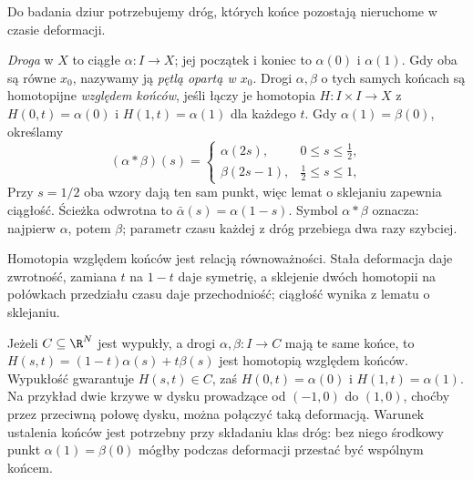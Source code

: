 Do badania dziur potrzebujemy dróg,
których końce pozostają nieruchome w czasie deformacji.

\begin{definicja}
\label{def:droga-petla}
\emph{Droga} w $X$ to ciągłe
$\alpha:I\to X$; jej początek i koniec
to $\alpha(0)$ i $\alpha(1)$.
Gdy oba są równe $x_0$, nazywamy ją
\emph{pętlą opartą w $x_0$}.
Drogi $\alpha,\beta$ o tych samych końcach
są homotopijne \emph{względem końców},
jeśli łączy je homotopia $H:I\times I\to X$
z $H(0,t)=\alpha(0)$ i
$H(1,t)=\alpha(1)$ dla każdego $t$.
Gdy $\alpha(1)=\beta(0)$, określamy
\[
 (\alpha*\beta)(s)=
 \begin{cases}
  \alpha(2s),&0\leq s\leq\tfrac12,\\
  \beta(2s-1),&\tfrac12\leq s\leq1,
 \end{cases}
\]
Przy $s=1/2$ oba wzory dają ten sam punkt,
więc lemat o sklejaniu zapewnia ciągłość.
Ścieżka odwrotna to $\bar\alpha(s)=\alpha(1-s)$.
Symbol $\alpha*\beta$ oznacza: najpierw $\alpha$,
potem $\beta$; parametr czasu każdej z dróg
przebiega dwa razy szybciej.
\end{definicja}

Homotopia względem końców jest relacją równoważności.
Stała deformacja daje zwrotność, zamiana $t$ na $1-t$ daje
symetrię, a sklejenie dwóch homotopii na połówkach przedziału
czasu daje przechodniość; ciągłość wynika z lematu o sklejaniu.

\begin{przyklad}
Jeżeli $C\subseteq\R^N$ jest wypukły, a drogi
$\alpha,\beta:I\to C$ mają te same końce,
to $H(s,t)=(1-t)\alpha(s)+t\beta(s)$ jest homotopią
względem końców. Wypukłość gwarantuje $H(s,t)\in C$,
zaś $H(0,t)=\alpha(0)$ i $H(1,t)=\alpha(1)$.
Na przykład dwie krzywe w dysku prowadzące od
$(-1,0)$ do $(1,0)$, choćby przez przeciwną połowę
dysku, można połączyć taką deformacją.
Warunek ustalenia końców jest potrzebny przy
składaniu klas dróg: bez niego środkowy punkt
$\alpha(1)=\beta(0)$ mógłby podczas deformacji
przestać być wspólnym końcem.
\end{przyklad}

